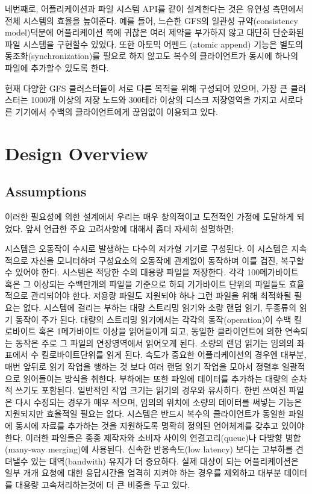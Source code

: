 \documentclass[twocolumn]{article}
\begin{document}
  네번째로, 어플리케이션과 파일 시스템 API를 같이 설계한다는 것은 유연성 측면에서 전체 시스템의 효율을 높여준다.  예를 들어, 느슨한 GFS의 일관성 규약(consistency model)덕분에  어플리케이션 쪽에 귀찮은 여러 제약을 부가하지 않고 대단히 단순화된 파일 시스템을 구현할수 있었다.  또한 아토믹 어펜드 (atomic append) 기능은 별도의 동조화(synchronization)를 필요로 하지 않고도 복수의 클라이언트가 동시에 하나의 파일에 추가할수 있도록 한다.

  현재 다양한 GFS 클러스터들이 서로 다른 목적을 위해 구성되어 있으며, 가장 큰 클러스터는 1000개 이상의 저장 노드와 300테라 이상의 디스크 저장영역을 가지고 서로다른 기기에서 수백의 클라이언트에게 끊임없이 이용되고 있다.

\section{Design Overview}
\subsection{Assumptions}

 이러한 필요성에 의한 설계에서 우리는 매우 창의적이고 도전적인 가정에 도달하게 되었다.  앞서 언급한 주요 고려사항에 대해서 좀더 자세히 설명하면;

시스템은 오동작이 수시로 발생하는 다수의 저가형 기기로 구성된다.  이 시스템은 지속적으로 자신을 모니터하며 구성요소의 오동작에 관계없이 동작하며 이를 검진, 복구할 수 있어야 한다.
시스템은 적당한 수의 대용량 파일을 저장한다.  각각 100메가바이트 혹은 그 이상되는 수백만개의 파일을 기준으로 하되 기가바이트 단위의 파일들도 효율적으로 관리되어야 한다.  저용량 파일도 지원되야 하나 그런 파일을 위해 최적화될 필요는 없다.
시스템에 걸리는 부하는 대량 스트리밍 읽기와 소량 랜덤 읽기, 두종류의 읽기 동작이 주가 된다.  대량의 스트리밍 읽기에서는 각각의 동작(operation)이 수백 킬로바이트 혹은 1메가바이트 이상을 읽어들이게 되고, 동일한 클라이언트에 의한 연속되는 동작은 주로 그 파일의 연장영역에서 읽어오게 된다.  소량의 랜덤 읽기는 임의의 좌표에서 수 킬로바이트단위를 읽게 된다.  속도가 중요한 어플리케이션의 경우엔 대부분, 매번 앞뒤로 읽기 작업을 행하는 것 보다 여러 랜덤 읽기 작업을 모아서 정렬후 일괄적으로 읽어들이는 방식을 취한다.
부하에는 또한 파일에 데이터를 추가하는 대량의 순차적 쓰기도 포함된다.  일반적인 작업 크기는 읽기의 경우와 유사하다.  한번 쓰여진 파일은 다시 수정되는 경우가 매우 적으며,  임의의 위치에 소량의 데이터를 써넣는 기능은 지원되지만 효율적일 필요는 없다.
시스템은 반드시 복수의 클라이언트가 동일한 파일에 동시에 자료를 추가하는 것을 지원하도록 명확히 정의된 언어체계를 갖추고 있어야 한다.  이러한 파일들은 종종 제작자와 소비자 사이의 연결고리(queue)나 다방향 병합(many-way merging)에 사용된다.
신속한 반응속도(low latency) 보다는 고부하를 견뎌낼수 있는 대역(bandwith) 유지가 더 중요하다. 실제 대상이 되는 어플리케이션은 일부 개개 요청에 대한 응답시간을 엄격히 지켜야 하는 경우를 제외하고 대부분 데이터를 대용량 고속처리하는것에 더 큰 비중을 두고 있다.
\end{document}
